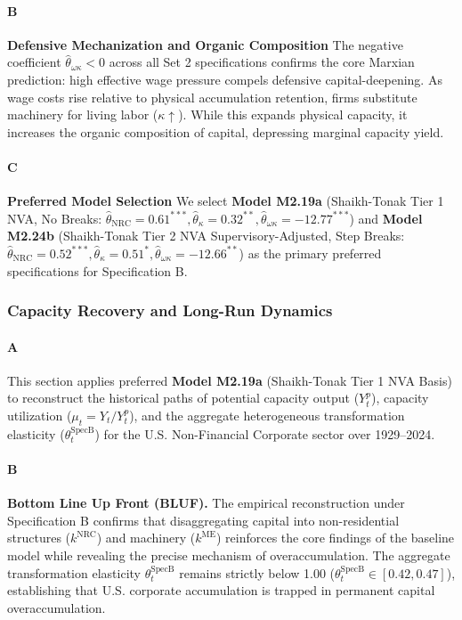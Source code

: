 \paragraph{B}
\textbf{Defensive Mechanization and Organic Composition}
The negative coefficient $\hat{\theta}_{\omega\kappa} < 0$ across all Set 2 specifications confirms the core Marxian prediction: high effective wage pressure compels defensive capital-deepening. As wage costs rise relative to physical accumulation retention, firms substitute machinery for living labor ($\kappa \uparrow$). While this expands physical capacity, it increases the organic composition of capital, depressing marginal capacity yield.

\paragraph{C}
\textbf{Preferred Model Selection}
We select \textbf{Model M2.19a} (Shaikh-Tonak Tier 1 NVA, No Breaks: $\hat{\theta}_{\text{NRC}} = 0.61^{***}, \hat{\theta}_{\kappa} = 0.32^{**}, \hat{\theta}_{\omega\kappa} = -12.77^{***}$) and \textbf{Model M2.24b} (Shaikh-Tonak Tier 2 NVA Supervisory-Adjusted, Step Breaks: $\hat{\theta}_{\text{NRC}} = 0.52^{***}, \hat{\theta}_{\kappa} = 0.51^{*}, \hat{\theta}_{\omega\kappa} = -12.66^{**}$) as the primary preferred specifications for Specification B.

\subsubsection{Capacity Recovery and Long-Run Dynamics}

\paragraph{A}
This section applies preferred \textbf{Model M2.19a} (Shaikh-Tonak Tier 1 NVA Basis) to reconstruct the historical paths of potential capacity output ($Y_t^p$), capacity utilization ($\mu_t = Y_t / Y_t^p$), and the aggregate heterogeneous transformation elasticity ($\theta_t^{\text{SpecB}}$) for the U.S. Non-Financial Corporate sector over 1929–2024.

\paragraph{B}
\textbf{Bottom Line Up Front (BLUF).} The empirical reconstruction under Specification B confirms that disaggregating capital into non-residential structures ($k^{\text{NRC}}$) and machinery ($k^{\text{ME}}$) reinforces the core findings of the baseline model while revealing the precise mechanism of overaccumulation. The aggregate transformation elasticity $\theta_t^{\text{SpecB}}$ remains strictly below 1.00 ($\theta_t^{\text{SpecB}} \in [0.42, 0.47]$), establishing that U.S. corporate accumulation is trapped in permanent capital overaccumulation.

